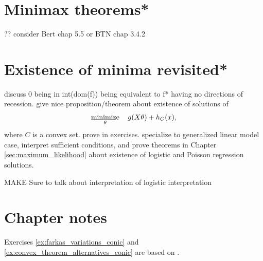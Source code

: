 \section{Minimax theorems*}
\label{sec:minimax_theorems}

?? consider Bert chap 5.5 or BTN chap 3.4.2 

\section{Existence of minima revisited*}
\label{sec:existence_minima_revisited}

discuss 0 being in int(dom(f)) being equivalent to f* having no directions
of recession.  give nice proposition/theorem about existence of solutions of 
$$
\operatorname*{minimize}_\theta \quad g(X \theta) + h_C(x),
$$
where $C$ is a convex set. prove in exercises. specialize to generalized linear
model case, interpret sufficient conditions, and prove theorems in Chapter
\ref{sec:maximum_likelihood} about existence of logistic and Poisson regression
solutions. 

MAKE Sure to talk about interpretation of logistic interpretation

\SkipTocEntry\section*{Chapter notes}

Exercises \ref{ex:farkas_variations_conic} and
\ref{ex:convex_theorem_alternatives_conic} are based on \cite{bental2023convex}.         

\clearpage

